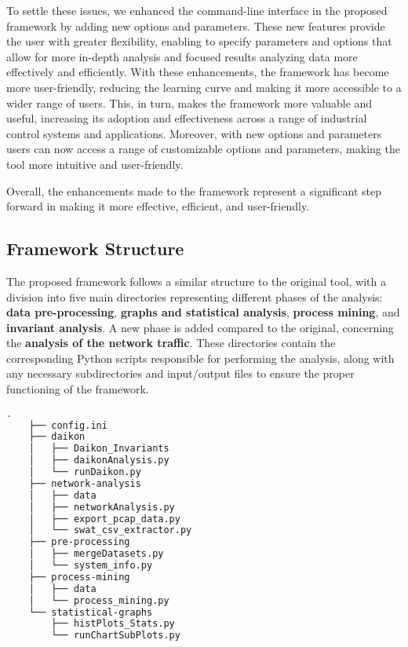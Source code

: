 \begin{description}
	\bigskip
	To settle these issues, we enhanced the command-line interface in the proposed framework by adding new options and parameters. These new features provide the user with greater flexibility, enabling to specify parameters and options that allow for more in-depth analysis and focused results analyzing data more effectively and efficiently. With these enhancements, the framework has become more user-friendly, reducing the learning curve and making it more accessible to a wider range of users. \newline
	This, in turn, makes the framework more valuable and useful, increasing its adoption and effectiveness across a range of industrial control systems and applications. \newline
	Moreover, with new options and parameters users can now access a range of customizable options and parameters, making the tool more intuitive and user-friendly. 
\end{description}

\noindent Overall, the enhancements made to the framework represent a significant step forward in making it more effective, efficient, and user-friendly.

\subsection{Framework Structure}
\label{subsec:4_framework_struct}
The proposed framework follows a similar structure to the original tool, with a division into five main directories representing different phases of the analysis: \textbf{data pre-processing}, \textbf{graphs and statistical analysis}, \textbf{process mining}, and \textbf{invariant analysis}. A new phase is added compared to the original, concerning the \textbf{analysis of the network traffic}. These directories contain the corresponding Python scripts responsible for performing the analysis, along with any necessary subdirectories and input/output files to ensure the proper functioning of the framework.

\begin{lstlisting}[language=bash, numbers=none, caption=Novel Framework structure and Python scripts, label=lst:4_tree_command]
	.
	├── config.ini
	├── daikon
	│   ├── Daikon_Invariants
	│   ├── daikonAnalysis.py
	│   └── runDaikon.py
	├── network-analysis
	│   ├── data
	│   ├── networkAnalysis.py
	│   ├── export_pcap_data.py
	│   └── swat_csv_extractor.py
	├── pre-processing
	│   ├── mergeDatasets.py
	│   └── system_info.py
	├── process-mining
	│   ├── data
	│   └── process_mining.py
	└── statistical-graphs
	    ├── histPlots_Stats.py
	    └── runChartSubPlots.py
\end{lstlisting}

